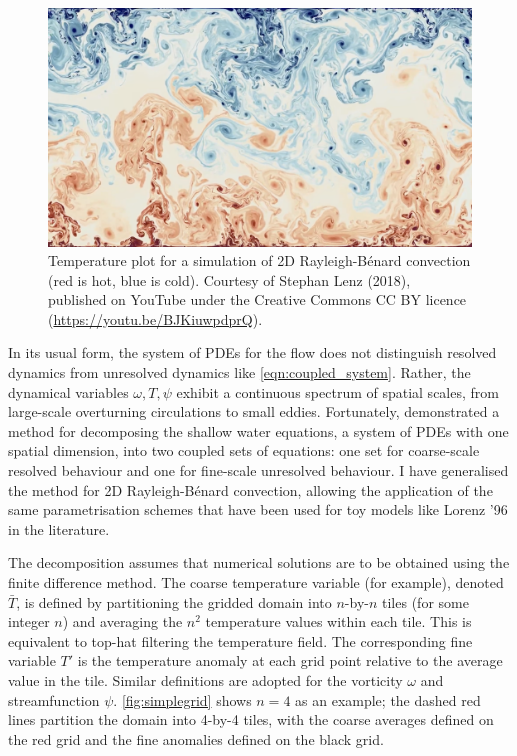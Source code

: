 \documentclass[titlepage]{article}
\newcommand{\rb}{Rayleigh-B\'{e}nard}
\begin{document}
\begin{figure}[ht]
    \centering
    \includegraphics[width=0.7\linewidth]{figures/rbc.png}
    \caption{
        Temperature plot for a simulation of 2D \rb{} convection (red is hot,
        blue is cold). Courtesy of Stephan Lenz (2018), published on
        YouTube under the Creative Commons CC BY licence
        (\url{https://youtu.be/BJKiuwpdprQ}).
    }
    \label{fig:rbc}
\end{figure}

In its usual form, the system of PDEs for the flow does not distinguish
resolved dynamics from unresolved dynamics like \autoref{eqn:coupled_system}.
Rather, the dynamical variables $\omega,T,\psi$ exhibit a continuous spectrum
of spatial scales, from large-scale overturning circulations to small eddies.
Fortunately, \textcite{zacharuk2018} demonstrated a method for decomposing the
shallow water equations, a system of PDEs with one spatial dimension, into two
coupled sets of equations: one set for coarse-scale resolved behaviour and one
for fine-scale unresolved behaviour. I have generalised the method for 2D
\rb{} convection, allowing the application of the same parametrisation
schemes that have been used for toy models like Lorenz '96 in the literature.

The decomposition assumes that numerical solutions are to be obtained
using the finite difference method. The coarse temperature variable (for
example), denoted $\bar{T}$, is defined by partitioning the gridded domain into
$n$-by-$n$ tiles (for some integer $n$) and averaging the $n^2$ temperature
values within each tile. This is equivalent to top-hat filtering the
temperature field. The corresponding fine variable $T'$ is the temperature
anomaly at each grid point relative to the average value in the tile. Similar
definitions are adopted for the vorticity $\omega$ and streamfunction $\psi$.
\autoref{fig:simplegrid} shows $n=4$ as an example; the dashed red lines
partition the domain into 4-by-4 tiles, with the coarse averages defined on the
red grid and the fine anomalies defined on the black grid.
\end{document}
